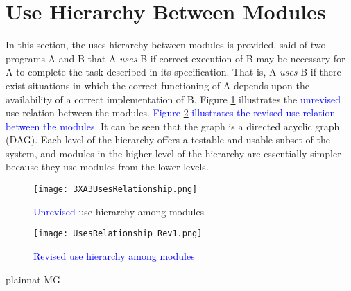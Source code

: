 \documentclass[12pt, titlepage]{article}
\begin{document}
\section{Use Hierarchy Between Modules} \label{SecUse}

In this section, the uses hierarchy between modules is
provided. \citet{Parnas1978} said of two programs A and B that A {\em uses} B if
correct execution of B may be necessary for A to complete the task described in
its specification. That is, A {\em uses} B if there exist situations in which
the correct functioning of A depends upon the availability of a correct
implementation of B.  Figure \ref{FigUH} illustrates the 
\textcolor{blue}{unrevised} use 
relation between the modules. \textcolor{blue}{Figure \ref{FigUH1} illustrates the revised 
use relation between the modules.} It can be seen that the graph is a directed acyclic 
graph (DAG). 
Each level of the hierarchy offers a testable and usable subset of the system, and 
modules in the higher level of the hierarchy are essentially simpler because they use 
modules from the lower levels.

\begin{figure}[H]
\centering
\texttt{[image: 3XA3UsesRelationship.png]}
\caption{\textcolor{blue}{Unrevised} use hierarchy among modules}
\label{FigUH}
\end{figure}

\begin{figure}[H]
	\centering
	\texttt{[image: UsesRelationship\_Rev1.png]}
	\caption{\textcolor{blue}{Revised use hierarchy among modules}}
	\label{FigUH1}
\end{figure}

 {plainnat}
 {MG}
\end{document}
